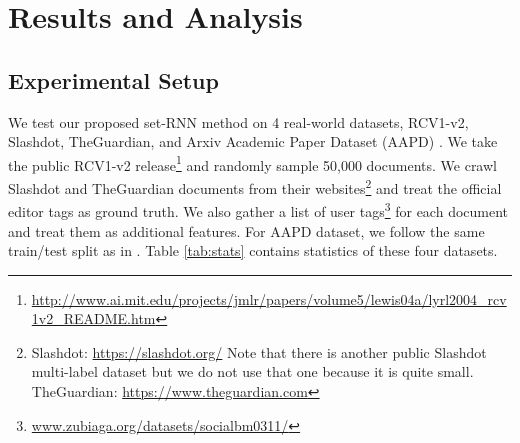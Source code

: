 \section{Results and Analysis}
\label{sec:results}
\subsection{Experimental Setup}
We test our proposed set-RNN method on 4 real-world datasets, RCV1-v2, Slashdot, TheGuardian, and Arxiv Academic Paper Dataset (AAPD) \cite{DBLP:journals/corr/abs-1806-04822}. We take the public RCV1-v2 release\footnote{\scriptsize\url{http://www.ai.mit.edu/projects/jmlr/papers/volume5/lewis04a/lyrl2004_rcv1v2_README.htm}} and randomly sample 50,000 documents. We crawl Slashdot and TheGuardian documents from their websites\footnote{\scriptsize Slashdot: \url{https://slashdot.org/} Note that there is another public Slashdot multi-label dataset \cite{read2009classifier} but we do not use that one because it is quite small. TheGuardian: \url{https://www.theguardian.com}  
} and treat the official editor tags as ground truth. We also gather a list of user tags\footnote{\scriptsize \url{www.zubiaga.org/datasets/socialbm0311/}} for each document and treat them as additional features. For AAPD dataset, we follow the same train/test split as in \cite{DBLP:journals/corr/abs-1806-04822}. Table \ref{tab:stats} contains statistics of these four datasets. 
\begin{table}[h]
\caption{\fontsize{10}{12}\selectfont  Statistics of the datasets.}\label{tab:stats}
\end{table}


